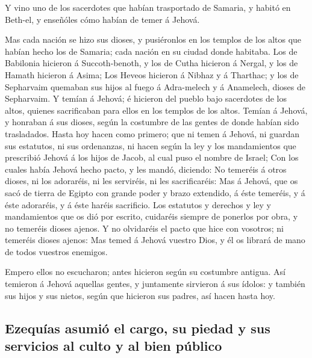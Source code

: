  Y vino uno de los sacerdotes que habían trasportado de
Samaria, y habitó en Beth-el, y enseñóles cómo habían de temer á Jehová.

 Mas cada nación se hizo sus dioses, y pusiéronlos en los
templos de los altos que habían hecho los de Samaria; cada nación en su
ciudad donde habitaba.  Los de Babilonia hicieron á
Succoth-benoth, y los de Cutha hicieron á Nergal, y los de Hamath
hicieron á Asima;  Los Heveos hicieron á Nibhaz y á
Tharthac; y los de Sepharvaim quemaban sus hijos al fuego á Adra-melech
y á Anamelech, dioses de Sepharvaim.  Y temían á Jehová;
é hicieron del pueblo bajo sacerdotes de los altos, quienes sacrificaban
para ellos en los templos de los altos.  Temían á Jehová,
y honraban á sus dioses, según la costumbre de las gentes de donde
habían sido trasladados.  Hasta hoy hacen como primero;
que ni temen á Jehová, ni guardan sus estatutos, ni sus ordenanzas, ni
hacen según la ley y los mandamientos que prescribió Jehová á los hijos
de Jacob, al cual puso el nombre de Israel;  Con los
cuales había Jehová hecho pacto, y les mandó, diciendo: No temeréis á
otros dioses, ni los adoraréis, ni les serviréis, ni les sacrificaréis:
 Mas á Jehová, que os sacó de tierra de Egipto con grande
poder y brazo extendido, á éste temeréis, y á éste adoraréis, y á éste
haréis sacrificio.  Los estatutos y derechos y ley y
mandamientos que os dió por escrito, cuidaréis siempre de ponerlos por
obra, y no temeréis dioses ajenos.  Y no olvidaréis el
pacto que hice con vosotros; ni temeréis dioses ajenos: 
Mas temed á Jehová vuestro Dios, y él os librará de mano de todos
vuestros enemigos.

 Empero ellos no escucharon; antes hicieron según su
costumbre antigua.  Así temieron á Jehová aquellas
gentes, y juntamente sirvieron á sus ídolos: y también sus hijos y sus
nietos, según que hicieron sus padres, así hacen hasta hoy.

\hypertarget{ezequuxedas-asumiuxf3-el-cargo-su-piedad-y-sus-servicios-al-culto-y-al-bien-puxfablico}{%
\subsection{Ezequías asumió el cargo, su piedad y sus servicios al culto
y al bien
público}\label{ezequuxedas-asumiuxf3-el-cargo-su-piedad-y-sus-servicios-al-culto-y-al-bien-puxfablico}}

